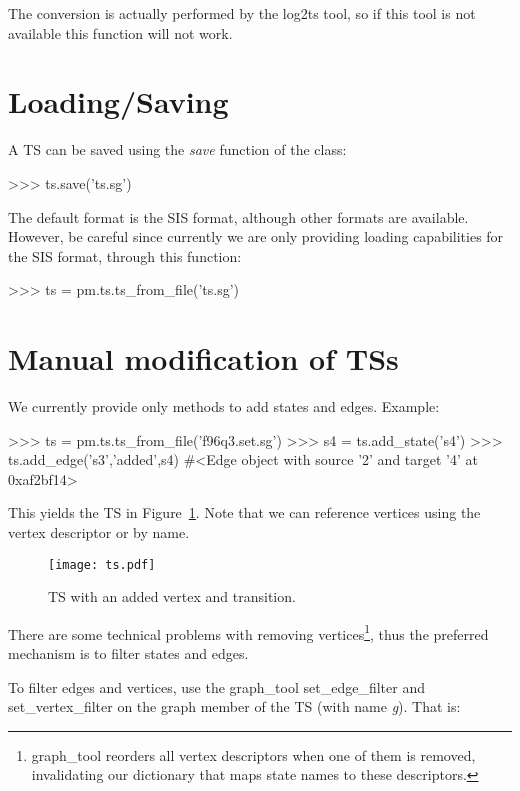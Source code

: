 \documentclass[a4paper,10pt]{book}
\begin{document}
The conversion is actually performed by the log2ts tool, so if this tool is not available this function will not work.

\section{Loading/Saving}
A TS can be saved using the \emph{save} function of the class:\\

\begin{pycode}
>>> ts.save('ts.sg')
\end{pycode}

The default format is the SIS format, although other formats are available. However, be careful since currently we are only providing loading capabilities for the SIS format, through this function:\\

\begin{pycode}
>>> ts = pm.ts.ts_from_file('ts.sg')
\end{pycode}

\section{Manual modification of TSs}
We currently provide only methods to add states and edges. Example:\\
\begin{pycode}
>>> ts = pm.ts.ts_from_file('f96q3.set.sg')
>>> s4 = ts.add_state('s4')
>>> ts.add_edge('s3','added',s4)
#<Edge object with source '2' and target '4' at 0xaf2bf14>
\end{pycode}

This yields the TS in Figure~\ref{fig:ts}. Note that we can reference vertices using the vertex descriptor or by name.
\begin{figure}[htb]
 \centering
 \texttt{[image: ts.pdf]}
 \caption{TS with an added vertex and transition.}
 \label{fig:ts}
\end{figure}


There are some technical problems with removing vertices\footnote{graph\_tool reorders all vertex descriptors when one of them is removed, invalidating our dictionary that maps state names to these descriptors.}, thus the preferred mechanism is to filter states and edges.

To filter edges and vertices, use the graph\_tool set\_edge\_filter and set\_vertex\_filter on the graph member of the TS (with name \emph{g}). That is:\\
\end{document}
